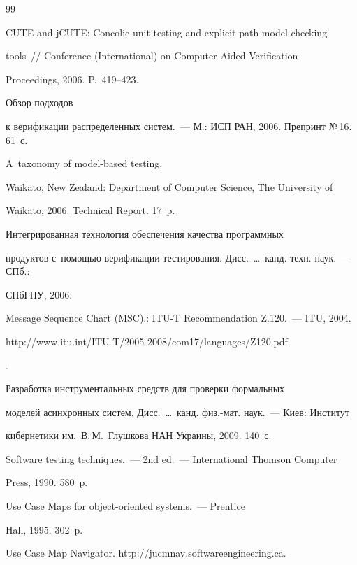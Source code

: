 {{\begin{thebibliography}{99}


 CUTE and jCUTE: Concolic unit testing and explicit path model-checking


tools~/\!\!/ Conference (International) on Computer Aided Verification


Proceedings, 2006. P.~419--423.




 Обзор подходов


к верификации распределенных систем.~--- М.: ИСП РАН, 2006. Препринт №\,16. 61~с.




 A~taxonomy of model-based testing.


Waikato, New Zealand: Department of Computer Science, The University of


Waikato, 2006.  Technical Report. 17~p.




 Интегрированная технология обеспечения качества программных


продуктов с~помощью верификации тестирования. Дисс.\ \ldots\ канд. техн. наук.~--- СПб.:


СПбГПУ, 2006.




Message Sequence Chart (MSC).: ITU-T Recommendation Z.120.~--- ITU, 2004. {\sf


http://www.itu.int/ITU-T/2005-2008/com17/languages/Z120.pdf}.




 Разработка инструментальных средств для проверки формальных


моделей асинхронных систем. Дисс.\ \ldots\  канд. физ.-мат. наук.~--- Киев: Институт


кибернетики им.~В.\,М.~Глушкова НАН Украины, 2009. 140~с.




 Software testing techniques.~--- 2nd ed.~--- International Thomson Computer


Press, 1990. 580~p.




 Use Case Maps for object-oriented systems.~--- Prentice


Hall, 1995. 302~p.




Use Case Map Navigator. {\sf http://jucmnav.softwareengineering.ca}.


\end{thebibliography}


} }








